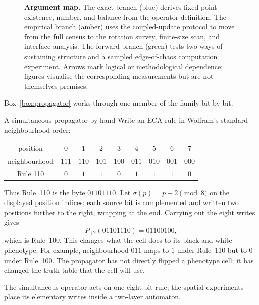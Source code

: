 \documentclass[man,12pt,floatsintext,donotrepeattitle]{apa7}
\newcommand{\sig}{\sigma}
\begin{document}
\begin{figure}[!tp]
\caption{\textbf{Argument map.} The exact branch (blue) derives fixed-point
existence, number, and balance from the operator definition. The empirical
branch (amber) uses the coupled-update protocol to move from the full census to
the rotation survey, finite-size scan, and interface analysis. The forward
branch (green) tests two ways of sustaining structure and a sampled
edge-of-chaos computation experiment. Arrows mark logical or methodological
dependence; figures visualise the corresponding measurements but are not
themselves premises.}
\label{fig:map}
\end{figure}

Box~\ref{box:propagator} works through one member of the
family bit by bit.

\begin{workedexample}[label={box:propagator}]{A simultaneous propagator by hand}
\small
Write an ECA rule in Wolfram's standard neighbourhood order:
\begin{center}
\setlength{\tabcolsep}{3.2pt}
\begin{tabular}{c@{\quad}*{8}{c}}
position & $0$ & $1$ & $2$ & $3$ & $4$ & $5$ & $6$ & $7$ \\
neighbourhood & $111$ & $110$ & $101$ & $100$ & $011$ & $010$ & $001$ & $000$ \\
\midrule
Rule 110 & $0$ & $1$ & $1$ & $0$ & $1$ & $1$ & $1$ & $0$ \\
\end{tabular}
\end{center}
Thus Rule~110 is the byte $01101110$. Let $\sig(p)=p+2\pmod 8$ on the
displayed position indices: each source bit is complemented and written two
positions further to the right, wrapping at the end.
Carrying out the eight writes gives
\[
P_{+2}(01101110)=01100100,
\]
which is Rule~100. This changes what the cell does to its black-and-white
phenotype. For example, neighbourhood $011$ maps to $1$ under Rule~110 but
to $0$ under Rule~100. The propagator has not directly flipped a phenotype
cell; it has changed the truth table that the cell will use.
\end{workedexample}

The simultaneous operator acts on one eight-bit rule; the spatial experiments
place its elementary writes inside a two-layer automaton.
\end{document}
